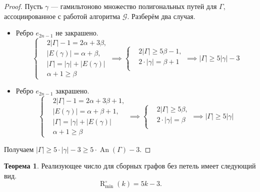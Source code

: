 \documentclass{article}
\theoremstyle{definition}
\newtheorem{theorem}{Теорема}[section]
\newcommand{\An}{\operatorname{An}}
\newcommand{\G}{\mathcal{G}}
\newcommand{\Romin}{\operatorname{R}_{\min}^\circ}
\begin{document}
\begin{proof}
    Пусть $\gamma$ — гамильтоново множество полигональных путей для $\Gamma$, ассоциированное с работой алгоритма $\G$. Разберём два случая.

    \begin{itemize}
    \item Ребро $e_{2n - 1}$ не закрашено.
    \[
    \left\{
    \begin{aligned}
        & 2|\Gamma| - 1 = 2\alpha + 3\beta, \\
        & |E(\gamma)| = \alpha + \beta, \\
        & |\Gamma| = |\gamma| + |E(\gamma)| \\
        & \alpha + 1 \geq \beta 
    \end{aligned} 
    \right. 
    \implies{
        \left\{
        \begin{aligned}
            & 2|\Gamma| \geq 5\beta - 1, \\
            & 2\cdot|\gamma| = \beta + 1 \\
        \end{aligned} 
        \right.     
    }
    \implies |\Gamma| \geq 5|\gamma| - 3
    \]
    \item Ребро $e_{2n - 1}$ закрашено.
    \[
    \left\{
    \begin{aligned}
        & 2|\Gamma| - 1 = 2\alpha + 3\beta + 1, \\
        & |E(\gamma)| = \alpha + \beta + 1, \\
        & |\Gamma| = |\gamma| + |E(\gamma)| \\
        & \alpha + 1 \geq \beta 
    \end{aligned} 
    \right.
    \implies{
        \left\{
        \begin{aligned}
            & 2|\Gamma| \geq 5\beta, \\
            & 2\cdot|\gamma| = \beta \\
        \end{aligned} 
        \right.
    } 
    \implies |\Gamma| \geq 5|\gamma|
    \]
\end{itemize}

Получаем $|\Gamma| \geq 5\cdot|\gamma| - 3 \geq 5 \cdot \An(\Gamma) - 3$.
\end{proof}

\begin{theorem}\label{th:Romin}
    Реализующее число для сборных графов без петель имеет следующий вид.
    \[
    \Romin(k) = 5k - 3.
    \]
\end{theorem}
\end{document}

